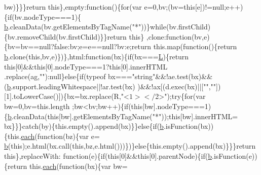 \begin{DoxyCode}
      bw)\}\}\}\textcolor{keywordflow}{return} \textcolor{keyword}{this}\},empty:\textcolor{keyword}{function}()\{\textcolor{keywordflow}{for}(var e=0,bv;(bv=\textcolor{keyword}{this}[e])!=null;e++)\{\textcolor{keywordflow}{if}(bv.nodeType===1)\{
      \hyperlink{a00039_aa4026ad5544b958e54ce5e106fa1c805}{b}.cleanData(bv.getElementsByTagName(\textcolor{stringliteral}{"*"}))\}\textcolor{keywordflow}{while}(bv.firstChild)\{bv.removeChild(bv.firstChild)\}\}\textcolor{keywordflow}{return} \textcolor{keyword}{this}\}
      ,clone:\textcolor{keyword}{function}(bv,e)\{bv=bv==null?\textcolor{keyword}{false}:bv;e=e==null?bv:e;\textcolor{keywordflow}{return} this.map(\textcolor{keyword}{function}()\{\textcolor{keywordflow}{return} 
      \hyperlink{a00039_aa4026ad5544b958e54ce5e106fa1c805}{b}.clone(\textcolor{keyword}{this},bv,e)\})\},html:\textcolor{keyword}{function}(bx)\{\textcolor{keywordflow}{if}(bx===\hyperlink{a00039_a38ee4c0b5f4fe2a18d0c783af540d253}{L})\{\textcolor{keywordflow}{return} \textcolor{keyword}{this}[0]&&\textcolor{keyword}{this}[0].nodeType===1?\textcolor{keyword}{this}[0].innerHTML
      .replace(ag,\textcolor{stringliteral}{""}):null\}\textcolor{keywordflow}{else}\{\textcolor{keywordflow}{if}(typeof bx===\textcolor{stringliteral}{"string"}&&!ae.test(bx)&&(\hyperlink{a00039_aa4026ad5544b958e54ce5e106fa1c805}{b}.support.leadingWhitespace||!ar.test(bx)
      )&&!ax[(d.exec(bx)||[\textcolor{stringliteral}{""},\textcolor{stringliteral}{""}])[1].toLowerCase()])\{bx=bx.replace(R,\textcolor{stringliteral}{"<$1></$2>"});\textcolor{keywordflow}{try}\{\textcolor{keywordflow}{for}(var bw=0,bv=this.length
      ;bw<bv;bw++)\{\textcolor{keywordflow}{if}(\textcolor{keyword}{this}[bw].nodeType===1)\{\hyperlink{a00039_aa4026ad5544b958e54ce5e106fa1c805}{b}.cleanData(\textcolor{keyword}{this}[bw].getElementsByTagName(\textcolor{stringliteral}{"*"}));\textcolor{keyword}{this}[bw].innerHTML=
      bx\}\}\}\textcolor{keywordflow}{catch}(by)\{this.empty().append(bx)\}\}\textcolor{keywordflow}{else}\{\textcolor{keywordflow}{if}(\hyperlink{a00039_aa4026ad5544b958e54ce5e106fa1c805}{b}.isFunction(bx))\{this.\hyperlink{a00039_a871ff39db627c54c710a3e9909b8234c}{each}(\textcolor{keyword}{function}(bz)\{var e=
      \hyperlink{a00039_aa4026ad5544b958e54ce5e106fa1c805}{b}(\textcolor{keyword}{this});e.html(bx.call(\textcolor{keyword}{this},bz,e.html()))\})\}\textcolor{keywordflow}{else}\{this.empty().append(bx)\}\}\}\textcolor{keywordflow}{return} \textcolor{keyword}{this}\},replaceWith:\textcolor{keyword}{
      function}(e)\{\textcolor{keywordflow}{if}(\textcolor{keyword}{this}[0]&&\textcolor{keyword}{this}[0].parentNode)\{\textcolor{keywordflow}{if}(\hyperlink{a00039_aa4026ad5544b958e54ce5e106fa1c805}{b}.isFunction(e))\{\textcolor{keywordflow}{return} this.\hyperlink{a00039_a871ff39db627c54c710a3e9909b8234c}{each}(\textcolor{keyword}{function}(bx)\{var bw=

\end{DoxyCode}
